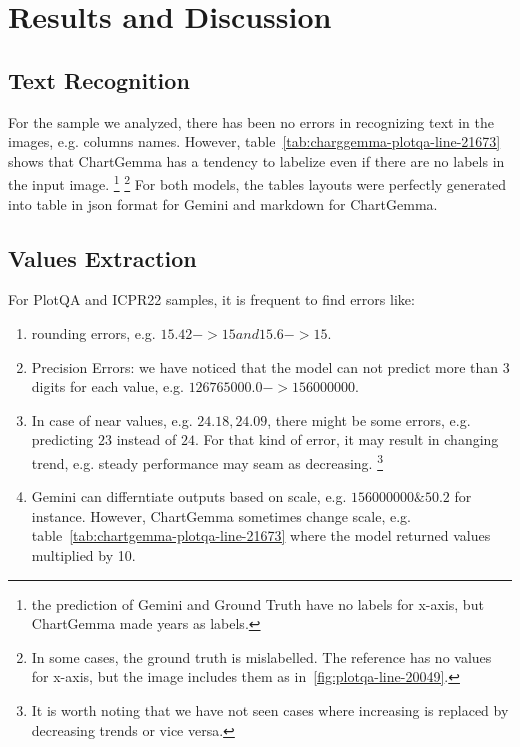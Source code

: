 \documentclass[
	letterpaper, %
]{jdf}
\begin{document}
\section{Results and Discussion}\label{sect:qualitative-analysis}
\subsection{Text Recognition}\label{ssect:qualitative-text-recognition}
For the sample we analyzed, there has been no errors in recognizing text in the images, e.g. columns names.
However, table~\ref{tab:charggemma-plotqa-line-21673} shows that ChartGemma has a tendency to labelize even if there are no labels in the input image.
\footnote{the prediction of Gemini and Ground Truth have no labels for x-axis, but ChartGemma made years as labels.}
\footnote{In some cases, the ground truth is mislabelled. The reference has no values for x-axis, but the image includes them as in~\ref{fig:plotqa-line-20049}.}
For both models, the tables layouts were perfectly generated into table in json format for Gemini and markdown for ChartGemma.

\subsection{Values Extraction}\label{ssect:values-extraction}
For PlotQA and ICPR22 samples, it is frequent to find errors like:
\begin{enumerate}
         \item rounding errors, e.g. $15.42->15 and 15.6->15$.
         \item Precision Errors: we have noticed that the model can not predict more than 3 digits for each value, e.g. $126765000.0->156000000$.
         \item In case of near values, e.g. $24.18, 24.09$, there might be some errors, e.g. predicting $23$ instead of $24$.
             For that kind of error, it may result in changing trend, e.g. steady performance may seam as decreasing.
             \footnote{It is worth noting that we have not seen cases where increasing is replaced by decreasing trends or vice versa.}
             \item Gemini can differntiate outputs based on scale, e.g. $156000000 \& 50.2$ for instance.
                 However, ChartGemma sometimes change scale, e.g. table~\ref{tab:chartgemma-plotqa-line-21673} where the model returned values multiplied by 10.
              \end{enumerate}
\end{document}

